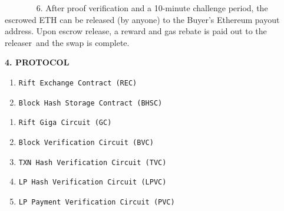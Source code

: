 \documentclass[
]{article}
\newcommand{\code}[1]{\texttt{#1}}
\providecommand{\tightlist}{%
  \setlength{\itemsep}{0pt}\setlength{\parskip}{0pt}}
\begin{document}
{}

{}

{~ ~ ~ ~ ~6. After proof verification and a 10-minute challenge
period, the escrowed ETH can be released (by anyone) to the Buyer's
Ethereum payout address. Upon escrow release, a reward and gas rebate is
paid out to the releaser}{~and the swap is complete.}

{}\vspace*{\baselineskip}


\begin{center}
\textbf{4. PROTOCOL}
\end{center}
{}\vspace*{\baselineskip}
{}

\hspace*{3em}{The protocol consists of 2 smart contracts and 5 zk-circuits. The
main components and their functionality are outlined below:}

{}
{}\vspace*{\baselineskip}

\hspace*{3em}{Smart Contracts:}

{}
\addtolength{\leftmargini}{0.6cm} %
\begin{enumerate}
\tightlist
\item \code{Rift Exchange Contract (REC)}
\item \code{Block Hash Storage Contract (BHSC)}
\end{enumerate}

{}

\hspace*{3em}{Zero-Knowledge Circuits:}

{}

\begin{enumerate}
\tightlist
\item \code  {Rift Giga Circuit (GC)}
\item \code  {Block Verification Circuit (BVC) }
\item \code  {TXN Hash Verification Circuit (TVC)}
\item \code  {LP Hash Verification Circuit (LPVC)}
\item \code  {LP Payment Verification Circuit (PVC)}
\end{enumerate}
\end{document}
